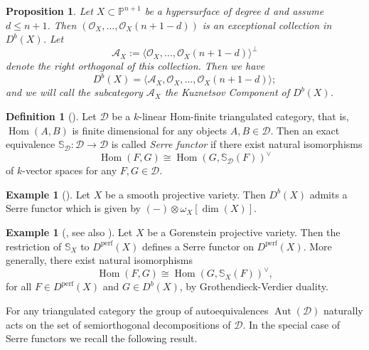 \documentclass[a4paper, twoside, 11pt]{amsart}
\newtheorem{proposition}[theorem]{Proposition}
\theoremstyle{definition}
\newtheorem{definition}[theorem]{Definition}
\newtheorem{example}[theorem]{Example}
\theoremstyle{remark}
\numberwithin{equation}{theorem}
\DeclareMathOperator{\Hom}{Hom}
\DeclareMathOperator{\lilperf}{perf}
\DeclareMathOperator{\aut}{Aut}
\newcommand{\dbx}{D^b(X)}
\begin{document}
\begin{proposition}\label{Kuzcomp_for_gorenstein}
	Let $X \subset \mathbb{P}^{n+1}$ be a hypersurface of degree $d$ and assume $d \leq n+1$. Then $(\mathcal{O}_X, \dots, \mathcal{O}_X(n+1-d))$ is an exceptional collection in $D^b(X)$. Let 
	\begin{equation*}
		\mathcal{A}_X := \langle \mathcal{O}_X, \dots, \mathcal{O}_X(n+1-d) \rangle^\perp
	\end{equation*}
	denote the right orthogonal of this collection. Then we have
	\begin{equation*}
		\dbx = \langle \mathcal{A}_X, \mathcal{O}_X, \dots, \mathcal{O}_X(n+1-d) \rangle;
	\end{equation*}
    and we will call the subcategory $\mathcal{A}_X$ the \textit{Kuznetsov Component} of $D^b(X)$.
\end{proposition}
\begin{definition}[{\cite[Definition 3.1]{BK_rep_funcots_serre_func}}]
	Let $\mathcal{D}$ be a $k$-linear Hom-finite triangulated category, that is, $\Hom(A,B)$ is finite dimensional for any objects $A,B \in \mathcal{D}$. Then an exact equivalence $\mathbb{S}_{\mathcal{D}} \colon\mathcal{D} \to \mathcal{D}$ is called \textit{Serre functor} if there exist natural isomorphisms 
	\begin{equation*}
		\Hom(F,G) \cong \Hom(G, \mathbb{S}_{\mathcal{D}}(F))^\vee
	\end{equation*}
	of $k$-vector spaces for any $F,G \in \mathcal{D}$. 
\end{definition}
\begin{example}[{\cite[Example 3.2]{BK_rep_funcots_serre_func}}]\label{Serre_smooth}
	Let $X$ be a smooth projective variety. Then $\dbx$ admits a Serre functor which is given by $(-) \otimes \omega_{X}[\dim(X)]$.
\end{example}
\begin{example}[{\cite[§2.3]{Kalck_Shinder_Pavic}, see also \cite[§6]{Ballard}}]\label{GVD_Gorenstein}
	Let $X$ be a Gorenstein projective variety. Then the restriction of $\mathbb{S}_X$ to $D^{\lilperf}(X)$ defines a Serre functor on $D^{\lilperf}(X)$. More generally, there exist natural isomorphisms 
	\begin{equation*}
		\Hom({F}, {G}) \cong \Hom({G},\mathbb{S}_X(F))^\vee,
	\end{equation*}
	for all ${F} \in D^{\lilperf}(X)$ and ${G} \in \dbx$, by Grothendieck-Verdier duality. 
\end{example}
For any triangulated category the group of autoequivalences $\aut(\mathcal{D})$ naturally acts on the set of semiorthogonal decompositions of $\mathcal{D}$. In the special case of Serre functors we recall the following result.
\end{document}
